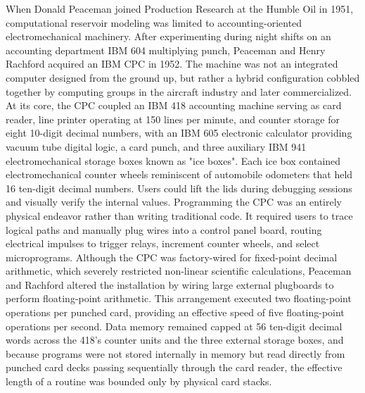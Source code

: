 When Donald Peaceman joined Production Research at the Humble Oil in 1951, computational reservoir modeling was limited to accounting-oriented electromechanical machinery. After experimenting during night shifts on an accounting department IBM 604 multiplying punch, Peaceman and Henry Rachford acquired an IBM CPC in 1952. The machine was not an integrated computer designed from the ground up, but rather a hybrid configuration cobbled together by computing groups in the aircraft industry and later commercialized. At its core, the CPC coupled an IBM 418 accounting machine serving as card reader, line printer operating at 150 lines per minute, and counter storage for eight 10-digit decimal numbers, with an IBM 605 electronic calculator providing vacuum tube digital logic, a card punch, and three auxiliary IBM 941 electromechanical storage boxes known as "ice boxes". Each ice box contained electromechanical counter wheels reminiscent of automobile odometers that held 16 ten-digit decimal numbers. Users could lift the lids during debugging sessions and visually verify the internal values. Programming the CPC was an entirely physical endeavor rather than writing traditional code. It required users to trace logical paths and manually plug wires into a control panel board, routing electrical impulses to trigger relays, increment counter wheels, and select microprograms. Although the CPC was factory-wired for fixed-point decimal arithmetic, which severely restricted non-linear scientific calculations, Peaceman and Rachford altered the installation by wiring large external plugboards to perform floating-point arithmetic. This arrangement executed two floating-point operations per punched card, providing an effective speed of five floating-point operations per second. Data memory remained capped at 56 ten-digit decimal words across the 418’s counter units and the three external storage boxes, and because programs were not stored internally in memory but read directly from punched card decks passing sequentially through the card reader, the effective length of a routine was bounded only by physical card stacks. \cite{peacemanPersonalRetrospectionReservoir1990}


